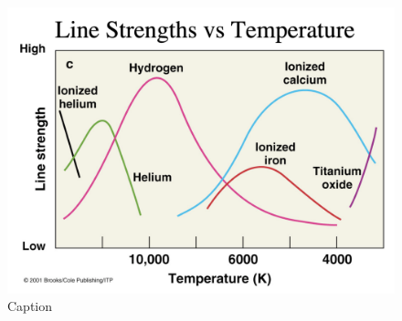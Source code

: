 \begin{figure}
    \centering
    \includegraphics[scale=0.4]{Notes_Images/ionisation1.png}
    \caption{Caption}
    \label{fig:enter-label}
\end{figure}
\newpage